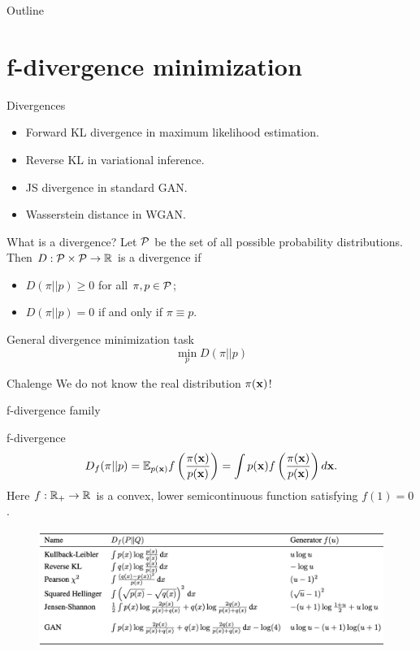 \begin{frame}{Outline}
	\tableofcontents
\end{frame}
\section{f-divergence minimization}
\begin{frame}{Divergences}
	\begin{itemize}
		\item Forward KL divergence in maximum likelihood estimation.
		\item Reverse KL in variational inference.
		\item JS divergence in standard GAN.
		\item Wasserstein distance in WGAN.
	\end{itemize}
	\begin{block}{What is a divergence?}
		Let $\mathcal{P}$ be the set of all possible probability distributions. Then $D: \mathcal{P} \times \mathcal{P} \rightarrow \mathbb{R}$ is a divergence if 
		\begin{itemize}
			\item $D(\pi || p) \geq 0$ for all $\pi, p \in \mathcal{P}$;
			\item $D(\pi || p) = 0$ if and only if $\pi \equiv p$.
		\end{itemize}
	\end{block}
	\begin{block}{General divergence minimization task}
		\vspace{-0.3cm}
		\[
			\min_p D(\pi || p)
		\]
		\vspace{-0.7cm}
	\end{block}
	\begin{block}{Chalenge}
		We do not know the real distribution $\pi(\mathbf{x})$!
	\end{block}
\end{frame}
\begin{frame}{f-divergence family}
	
	\begin{block}{f-divergence}
		\vspace{-0.3cm}
		\[
		D_f(\pi || p) = \mathbb{E}_{p(\mathbf{x})}  f\left( \frac{\pi(\mathbf{x})}{p(\mathbf{x})} \right)  = \int p(\mathbf{x}) f\left( \frac{\pi(\mathbf{x})}{p(\mathbf{x})} \right) d \mathbf{x}.
		\]
		Here $f: \mathbb{R}_+ \rightarrow \mathbb{R}$ is a convex, lower semicontinuous function satisfying $f(1) = 0$.
	\end{block}
	\begin{figure}
		\centering
		\includegraphics[width=\linewidth]{figs/f_divs}
	\end{figure}
\end{frame}
